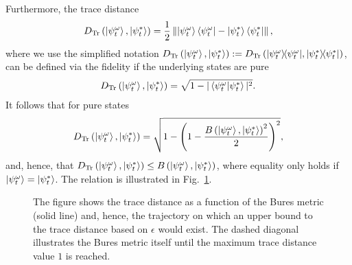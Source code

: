 \documentclass[twocolumn, aps, pra, superscriptaddress]{revtex4-1}
\newcommand{\norm}[1]{\left\lVert#1\right\rVert}
\newcommand{\proj}[1]{|#1\rangle\!\langle #1|}
\begin{document}
Furthermore, the trace distance 
\begin{align}
    D_{\text{Tr}}\left(\ket{\psi^{\omega}_t}, \ket{\psi^*_t} \right) = \frac{1}{2} \norm{\ket{\psi^{\omega}_t}\bra{\psi^{\omega}_t}-\ket{\psi^*_t}\bra{\psi^*_t}},
\end{align}
where we use the simplified notation $D_{\text{Tr}}\left(\ket{\psi^{\omega}_t}, \ket{\psi^*_t} \right):=D_{\text{Tr}}\left(\proj{\psi^{\omega}_t}, \proj{\psi^*_t} \right)$, can be defined via the fidelity if the underlying states are pure
\begin{align}
    D_{\text{Tr}}\left(\ket{\psi^{\omega}_t}, \ket{\psi^*_t} \right) = \sqrt{1-|\braket{\psi^{\omega}_t|\psi^*_t}|^2}.
\end{align}
It follows that for pure states
\begin{align}
    D_{\text{Tr}}\left(\ket{\psi^{\omega}_t}, \ket{\psi^*_t} \right) = \sqrt{1-\left(1-\frac{B\left(\ket{\psi^{\omega}_t}, \ket{\psi^*_t} \right)^2}{2}\right)^2},
\end{align}
and, hence, that $ D_{\text{Tr}}\left(\ket{\psi^{\omega}_t}, \ket{\psi^*_t} \right)\leq B\left(\ket{\psi^{\omega}_t}, \ket{\psi^*_t} \right)$, where equality only holds if $\ket{\psi^{\omega}_t} = \ket{\psi^*_t}$. The relation is illustrated in Fig.~\ref{fig:trace_bures}.

\begin{figure}[!ht]
    \centering
    \captionsetup{singlelinecheck = false, format= hang, justification=centerlast, font=footnotesize, labelsep=space}
    \caption{The figure shows the trace distance as a function of the Bures metric (solid line) and, hence, the trajectory on which an upper bound to the trace distance based on $\epsilon$ would exist. The dashed diagonal illustrates the Bures metric itself until the maximum trace distance value $1$ is reached.}
    \label{fig:trace_bures}
\end{figure}
\end{document}
